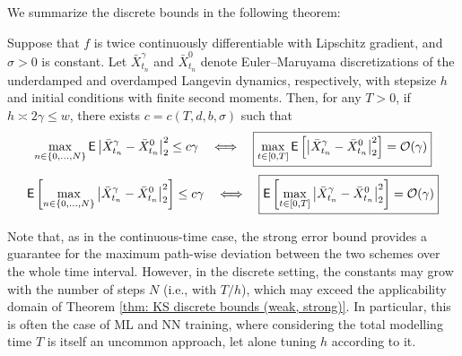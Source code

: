 \documentclass[12pt]{article}
\begin{document}
We summarize the discrete bounds in the following theorem:

\begin{theorem}
\label{thm: KS discrete bounds (weak, strong)}
Suppose that $f$ is twice continuously differentiable with Lipschitz gradient, and $\sigma>0$ is constant. Let $\bar{X}^\gamma_{t_n}$ and $\bar{X}^0_{t_n}$ denote Euler--Maruyama discretizations of the underdamped and overdamped Langevin dynamics, respectively, with stepsize $h$ and initial conditions with finite second moments. Then, for any $T>0$, if $h \asymp 2\gamma \leq w$, there exists $c = c(T, d, b, \sigma)$ such that
\begin{equation}
\label{eq: KS discrete bound weak}
\max_{n\in\{0,\ldots,N\}} {\mathsf E}\left|\bar{X}_{t_n}^\gamma - \bar{X}_{t_n}^0\right|_2^2 \leq c\gamma\quad\Longleftrightarrow
\quad\boxed{
 \max_{t \in [0, T]}{\mathsf E}\left[\left|\bar{X}_{t_n}^\gamma - \bar{X}_{t_n}^0\right|_2^2 \right] = \mathcal{O}(\gamma)
}
\end{equation}
\begin{equation}
\label{eq: KS discrete bound strong}
{\mathsf E}\left[\max_{n\in\{0, \ldots, N\}}\left|\bar{X}_{t_n}^\gamma - \bar{X}_{t_n}^0\right|_2^2\right] \leq c\gamma
\quad\Longleftrightarrow\quad
\boxed{
{\mathsf E}\left[\max_{t \in [0, T]}\left|\bar{X}_{t_n}^\gamma - \bar{X}_{t_n}^0\right|_2^2\right] = \mathcal{O}(\gamma)
}
\end{equation}
\end{theorem}
\begin{remark}
Note that, as in the continuous-time case, the strong error bound provides a guarantee for the maximum path-wise deviation between the two schemes over the whole time interval. However, in the discrete setting, the constants may grow with the number of steps $N$ (i.e., with $T/h$), which may exceed the applicability domain of Theorem \ref{thm: KS discrete bounds (weak, strong)}.
In particular, this is often the case of ML and NN training, where considering the total modelling time $T$ is itself an uncommon approach, let alone tuning $h$ according to it.
\end{remark}
\end{document}
